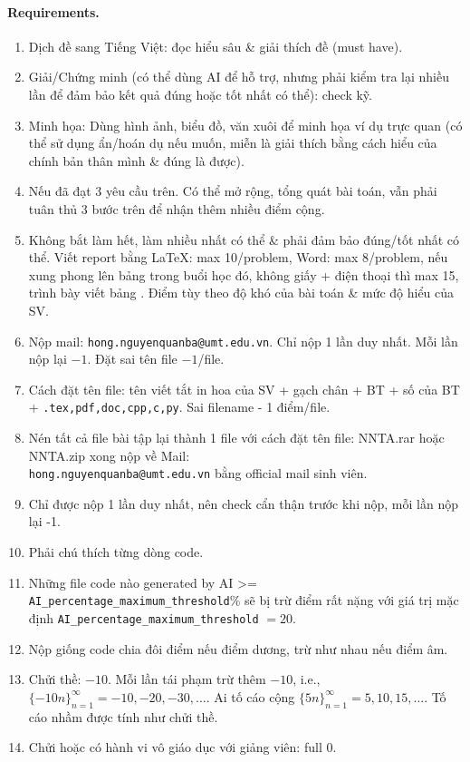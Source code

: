 \documentclass{article}
\begin{document}
\paragraph{Requirements.}
\begin{enumerate}
	\item Dịch đề sang Tiếng Việt: đọc hiểu sâu \& giải thích đề (must have).
	\item Giải/Chứng minh (có thể dùng AI để hỗ trợ, nhưng phải kiểm tra lại nhiều lần để đảm bảo kết quả đúng hoặc tốt nhất có thể): check kỹ.
	\item Minh họa: Dùng hình ảnh, biểu đồ, văn xuôi để minh họa ví dụ trực quan (có thể sử dụng ẩn/hoán dụ nếu muốn, miễn là giải thích bằng cách hiểu của chính bản thân mình \& đúng là được).
	\item Nếu đã đạt 3 yêu cầu trên. Có thể mở rộng, tổng quát bài toán, vẫn phải tuân thủ 3 bước trên để nhận thêm nhiều điểm cộng.
	\item Không bắt làm hết, làm nhiều nhất có thể \& phải đảm bảo đúng/tốt nhất có thể. Viết report bằng LaTeX: max 10/problem, Word: max 8/problem, nếu xung phong lên bảng trong buổi học đó, không giấy + điện thoại thì max 15, trình bày viết bảng . Điểm tùy theo độ khó của bài toán \& mức độ hiểu của SV.
	\item Nộp mail: {\tt hong.nguyenquanba@umt.edu.vn}. Chỉ nộp 1 lần duy nhất. Mỗi lần nộp lại $-1$. Đặt sai tên file $-1$/file.
	\item Cách đặt tên file: tên viết tắt in hoa của SV + gạch chân + BT + số của BT + {\tt.{tex,pdf,doc,cpp,c,py}}. Sai filename - 1 điểm/file.
	\item Nén tất cả file bài tập lại thành 1 file với cách đặt tên file: NNTA.rar hoặc NNTA.zip xong nộp về Mail:\\{\tt hong.nguyenquanba@umt.edu.vn} bằng official mail sinh viên.
	\item Chỉ được nộp 1 lần duy nhất, nên check cẩn thận trước khi nộp, mỗi lần nộp lại -1.
	\item Phải chú thích từng dòng code.
	\item Những file code nào generated by AI >= \verb|AI_percentage_maximum_threshold|\% sẽ bị trừ điểm rất nặng với giá trị mặc định \verb|AI_percentage_maximum_threshold| $= 20$.
	\item Nộp giống code chia đôi điểm nếu điểm dương, trừ như nhau nếu điểm âm.
	\item Chửi thề: $-10$. Mỗi lần tái phạm trừ thêm $-10$, i.e., $\{-10n\}_{n=1}^\infty = -10,-20,-30,\ldots$. Ai tố cáo cộng $\{5n\}_{n=1}^\infty = 5,10,15,\ldots$. Tố cáo nhầm được tính như chửi thề.
	\item Chửi hoặc có hành vi vô giáo dục với giảng viên: full 0.
\end{enumerate}
\end{document}
